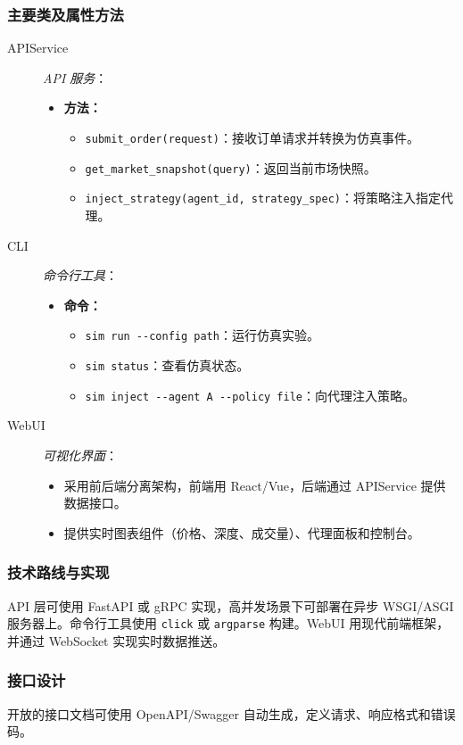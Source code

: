 \subsubsection{主要类及属性方法}
\begin{description}
  \item[APIService] \emph{API 服务}：
  \begin{itemize}
    \item \textbf{方法：}
      \begin{itemize}
        \item \verb|submit_order(request)|：接收订单请求并转换为仿真事件。
        \item \verb|get_market_snapshot(query)|：返回当前市场快照。
        \item \verb|inject_strategy(agent_id, strategy_spec)|：将策略注入指定代理。
      \end{itemize}
  \end{itemize}
  \item[CLI] \emph{命令行工具}：
  \begin{itemize}
    \item \textbf{命令：}
      \begin{itemize}
        \item \verb|sim run --config path|：运行仿真实验。
        \item \verb|sim status|：查看仿真状态。
        \item \verb|sim inject --agent A --policy file|：向代理注入策略。
      \end{itemize}
  \end{itemize}
  \item[WebUI] \emph{可视化界面}：
  \begin{itemize}
    \item 采用前后端分离架构，前端用 React/Vue，后端通过 APIService 提供数据接口。
    \item 提供实时图表组件（价格、深度、成交量）、代理面板和控制台。
  \end{itemize}
\end{description}

\subsubsection{技术路线与实现}
API 层可使用 FastAPI 或 gRPC 实现，高并发场景下可部署在异步 WSGI/ASGI 服务器上。命令行工具使用 \verb|click| 或 \verb|argparse| 构建。WebUI 用现代前端框架，并通过 WebSocket 实现实时数据推送。

\subsubsection{接口设计}
开放的接口文档可使用 OpenAPI/Swagger 自动生成，定义请求、响应格式和错误码。

